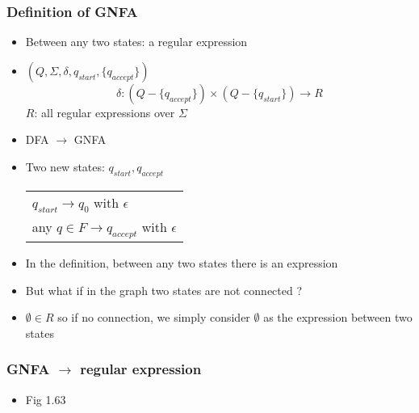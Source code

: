 




\begin{frame}[allowframebreaks] \frametitle{Definition of GNFA}
  \begin{itemize}
\item Between any two states: a regular expression
\item $(Q, \Sigma, \delta, q_{start}, \{q_{accept}\})$
  \begin{equation*}
    \delta:(Q-\{q_{accept}\})\times
(Q-\{q_{start}\})\rightarrow R
  \end{equation*}
$R$: all regular expressions over $\Sigma$



\item DFA $\rightarrow $ GNFA

\item [] Two new states: $q_{start}, q_{accept}$

  \begin{center}
    \begin{tabular}{l}
$q_{start} \rightarrow q_0$ with $\epsilon$ \\
any $q \in F \rightarrow q_{accept}$ with $\epsilon$
    \end{tabular}
\end{center}
\item In the definition, between any two states there is
  an expression

\item [] But what if in the graph two states are not connected ?

\item [] $\emptyset \in R$ so if no connection, we simply consider
  $\emptyset$ as the expression between two states
\end{itemize}\end{frame} \begin{frame}[allowframebreaks] \frametitle{GNFA $\rightarrow$ regular expression}
    \begin{itemize}
\item Fig 1.63


\end{itemize}
\end{frame}

